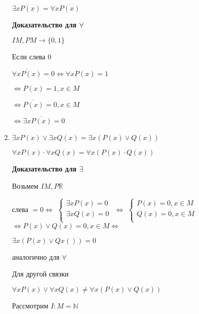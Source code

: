 \documentclass[russian]{lecture-notes}
\begin{document}
\begin{enumerate}
{            $\overline{\exists x P(x)} = \forall x \overline{P(x)}$

            \textbf{Доказательство для $\forall$}

            $I M, P M \rightarrow \{ 0, 1\}$

            Если слева 0

            $\overline{\forall x P(x)} = 0 \Leftrightarrow \forall x P(x) = 1$

            $\Leftrightarrow P(x) = 1, x \in M$

            $\Leftrightarrow \overline{P(x)} = 0, x \in M$

            $\Leftrightarrow \exists x \overline{P(x)} = 0$
        }

        \item{
            $\exists x P(x) \lor \exists x Q(x) = \exists x (P(x) \lor Q(x))$

            $\forall x P(x) \cdot \forall x Q(x) = \forall x (P(x) \cdot Q(x))$

            \textbf{Доказательство для $\exists$}

            Возьмем $I M, P \mathbb{R}$



            слева $ = 0 \Leftrightarrow$
            $\left \{
            \begin{gathered}
                \exists x P(x) = 0 \\
                \exists x Q(x) = 0 \\
            \end{gathered}
            \right.$
            $\Leftrightarrow$
            $\left \{
            \begin{gathered}
                P(x) = 0, x \in M \\
                Q(x) = 0, x \in M \\
            \end{gathered}
            \right.$
            $\Leftrightarrow P(x) \lor Q(x) = 0, x \in M \Leftrightarrow$

            $\exists x (P(x) \lor Qx()) = 0$

            аналогично для $\forall$

            \begin{remark}
                Для другой связки

                $\forall x P(x) \lor \forall x Q(x) \neq \forall x (P(x) \lor Q(x))$

                Рассмотрим $I: M = \mathbb{N}$


\end{remark}}
\end{enumerate}
\end{document}
